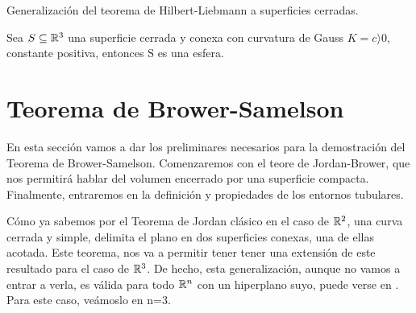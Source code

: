 Generalización del teorema de Hilbert-Liebmann a superficies cerradas.
\begin{theorem}
Sea $S \subseteq \mathbb{R}^3$ una superficie cerrada y conexa con curvatura de Gauss $K=c \rangle 0$, constante positiva, entonces S es una esfera.
\end{theorem}


\section{Teorema de Brower-Samelson}

En esta sección vamos a dar los preliminares necesarios para la demostración del Teorema de Brower-Samelson. Comenzaremos con el teore de Jordan-Brower, que nos permitirá hablar del volumen encerrado por una superficie compacta. Finalmente, entraremos en la definición y propiedades de los entornos tubulares.

Cómo ya sabemos por el Teorema de Jordan clásico en el caso de $\mathbb{R}^2$, una curva cerrada y simple, delimita el plano en dos superficies conexas, una de ellas acotada. Este teorema, nos va a permitir tener tener una extensión de este resultado para el caso de $\mathbb{R}^3$. De hecho, esta generalización, aunque no vamos a entrar a verla, es válida para todo $\mathbb{R}^n$ con un hiperplano suyo, puede verse en \cite{paperchicago}. Para este caso, veámoslo en n=3.

